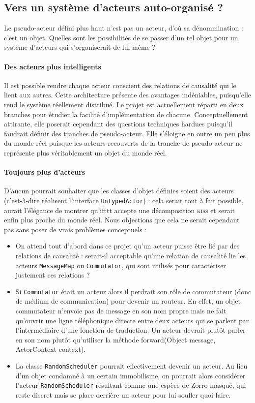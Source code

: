 \documentclass[11pt]{article}
\begin{document}
\subsection{Vers un système d'acteurs auto-organisé ?}\label{auto}

Le pseudo-acteur défini plus haut n'est pas un acteur, d'où sa dénommination : c'est un objet. Quelles sont les possibilités de se passer d'un tel objet pour un système d'acteurs qui s'organiserait de lui-même ?

\paragraph{Des acteurs plus intelligents} Il est possible rendre chaque acteur conscient des relations de causalité qui le lient aux autres. Cette architecture présente des avantages indéniables, puisqu'elle rend le système réellement distribué. Le projet est actuellement réparti en deux branches pour étudier la facilité d'implémentation de chacune. Conceptuellement attirante, elle poserait cependant des questions techniques hardues puisqu'il faudrait définir des \og tranches \fg{} de pseudo-acteur. Elle s'éloigne en outre un peu plus du monde réel puisque les acteurs recouverts de la tranche de pseudo-acteur ne représente plus véritablement un objet du monde réel.

\paragraph{Toujours plus d'acteurs} D'aucun pourrait souhaiter que les classes d'objet définies soient des acteurs (c'est-à-dire réalisent l'interface \texttt{UntypedActor}) : cela serait tout à fait possible, aurait l'élégance de montrer qu'ifttt accepte une décomposition \textsc{kiss} et serait enfin plus proche du monde réel. Nous objections que cela ne serait cependant pas sans poser de vrais problèmes conceptuels :
\begin{itemize}
\item On attend tout d'abord dans ce projet qu'un acteur puisse être lié par des relations de causalité : serait-il acceptable qu'une relation de causalité lie les acteurs \texttt{MessageMap} ou \texttt{Commutator}, qui sont utilisés pour caractériser justement ces relations ?
\item Si \texttt{Commutator} était un acteur alors il perdrait son rôle de commutateur (donc de médium de communication) pour devenir un routeur. En effet, un objet commutateur n'envoie pas de message en son nom propre mais ne fait qu'ouvrir une ligne téléphonique directe entre deux acteurs qui se parlent par l'intermédiaire d'une fonction de traduction. Un acteur devrait plutôt parler en son nom plutôt qu'utiliser la méthode forward(Object message, ActorContext context).
\item La classe \texttt{RandomScheduler} pourrait effectivement devenir un acteur. Au lieu d'un objet condamné à un certain immobilisme, on pourrait alors considérer l'acteur \texttt{RandomScheduler} résultant comme une espèce de Zorro masqué, qui reste discret mais se place derrière un acteur pour lui soufler quoi faire.
\end{itemize}
\end{document}
